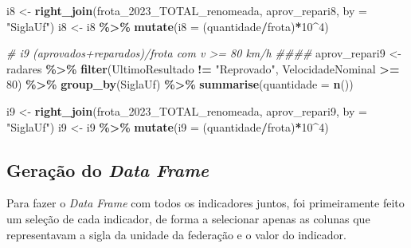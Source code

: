 \documentclass[
]{book}
\newenvironment{Shaded}{\begin{snugshade}}{\end{snugshade}}
\newcommand{\AttributeTok}[1]{\textcolor[rgb]{0.13,0.29,0.53}{#1}}
\newcommand{\CommentTok}[1]{\textcolor[rgb]{0.56,0.35,0.01}{\textit{#1}}}
\newcommand{\DecValTok}[1]{\textcolor[rgb]{0.00,0.00,0.81}{#1}}
\newcommand{\FunctionTok}[1]{\textcolor[rgb]{0.13,0.29,0.53}{\textbf{#1}}}
\newcommand{\NormalTok}[1]{#1}
\newcommand{\OtherTok}[1]{\textcolor[rgb]{0.56,0.35,0.01}{#1}}
\newcommand{\SpecialCharTok}[1]{\textcolor[rgb]{0.81,0.36,0.00}{\textbf{#1}}}
\newcommand{\StringTok}[1]{\textcolor[rgb]{0.31,0.60,0.02}{#1}}
\begin{document}
\begin{Shaded}
\begin{Highlighting}[]
\NormalTok{i8 }\OtherTok{\textless{}{-}} \FunctionTok{right\_join}\NormalTok{(frota\_2023\_TOTAL\_renomeada, aprov\_repari8, }\AttributeTok{by =} \StringTok{"SiglaUf"}\NormalTok{)}
\NormalTok{i8 }\OtherTok{\textless{}{-}}\NormalTok{ i8 }\SpecialCharTok{\%\textgreater{}\%} 
  \FunctionTok{mutate}\NormalTok{(}\AttributeTok{i8 =}\NormalTok{ (quantidade}\SpecialCharTok{/}\NormalTok{frota)}\SpecialCharTok{*}\DecValTok{10}\SpecialCharTok{\^{}}\DecValTok{4}\NormalTok{)}

\CommentTok{\# i9 (aprovados+reparados)/frota com v \textgreater{}= 80 km/h \#\#\#\#}
\NormalTok{aprov\_repari9 }\OtherTok{\textless{}{-}}\NormalTok{ radares }\SpecialCharTok{\%\textgreater{}\%} 
  \FunctionTok{filter}\NormalTok{(UltimoResultado }\SpecialCharTok{!=} \StringTok{"Reprovado"}\NormalTok{,}
\NormalTok{         VelocidadeNominal }\SpecialCharTok{\textgreater{}=} \DecValTok{80}\NormalTok{) }\SpecialCharTok{\%\textgreater{}\%} 
  \FunctionTok{group\_by}\NormalTok{(SiglaUf) }\SpecialCharTok{\%\textgreater{}\%} 
  \FunctionTok{summarise}\NormalTok{(}\AttributeTok{quantidade =} \FunctionTok{n}\NormalTok{())}


\NormalTok{i9 }\OtherTok{\textless{}{-}} \FunctionTok{right\_join}\NormalTok{(frota\_2023\_TOTAL\_renomeada, aprov\_repari9, }\AttributeTok{by =} \StringTok{"SiglaUf"}\NormalTok{)}
\NormalTok{i9 }\OtherTok{\textless{}{-}}\NormalTok{ i9 }\SpecialCharTok{\%\textgreater{}\%} 
  \FunctionTok{mutate}\NormalTok{(}\AttributeTok{i9 =}\NormalTok{ (quantidade}\SpecialCharTok{/}\NormalTok{frota)}\SpecialCharTok{*}\DecValTok{10}\SpecialCharTok{\^{}}\DecValTok{4}\NormalTok{)}
\end{Highlighting}
\end{Shaded}

\subsection{\texorpdfstring{Geração do \emph{Data Frame}}{Geração do Data Frame}}\label{gerauxe7uxe3o-do-data-frame}

Para fazer o \emph{Data Frame} com todos os indicadores juntos, foi primeiramente feito um seleção de cada indicador, de forma a selecionar apenas as colunas que representavam a sigla da unidade da federação e o valor do indicador.
\end{document}

